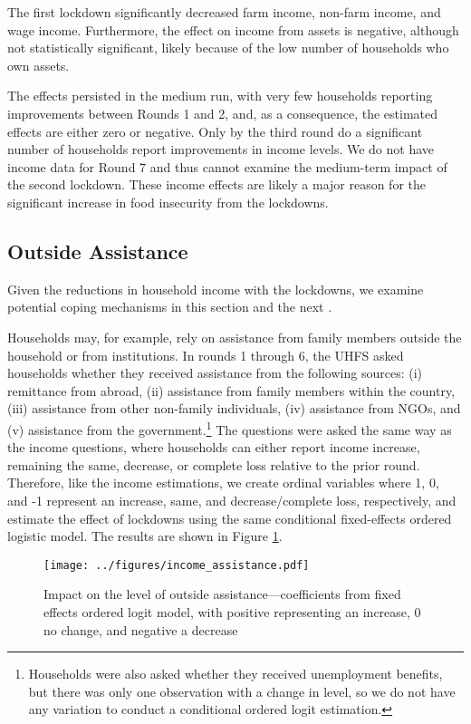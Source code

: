 \documentclass{wber}
\begin{document}
The first lockdown significantly decreased farm income, non-farm income,
and wage income. Furthermore, the effect on income from assets is
negative, although not statistically significant, likely because of the
low number of households who own assets.

The effects persisted in the medium run, with very few households
reporting improvements between Rounds 1 and 2, and, as a consequence,
the estimated effects are either zero or negative. Only by the third
round do a significant number of households report improvements in
income levels. We do not have income data for Round 7 and thus cannot
examine the medium-term impact of the second lockdown. These income
effects are likely a major reason for the significant increase in food
insecurity from the lockdowns.

\subsection{Outside Assistance}\label{outside-assistance}

Given the reductions in household income with the lockdowns, we examine
potential coping mechanisms in this section and the next
\citep{Morduch1995, Townsend1994}.

Households may, for example, rely on assistance from family members
outside the household or from institutions. In rounds 1 through 6, the
UHFS asked households whether they received assistance from the
following sources: (i) remittance from abroad, (ii) assistance from
family members within the country, (iii) assistance from other
non-family individuals, (iv) assistance from NGOs, and (v) assistance
from the government.\footnote{Households were also asked whether they
  received unemployment benefits, but there was only one observation
  with a change in level, so we do not have any variation to conduct a
  conditional ordered logit estimation.} The questions were asked the
same way as the income questions, where households can either report
income increase, remaining the same, decrease, or complete loss relative
to the prior round. Therefore, like the income estimations, we create
ordinal variables where 1, 0, and -1 represent an increase, same, and
decrease/complete loss, respectively, and estimate the effect of
lockdowns using the same conditional fixed-effects ordered logistic
model. The results are shown in Figure \ref{fig:income_assistance}.

\begin{figure}
\centering
\texttt{[image: ../figures/income\_assistance.pdf]}
\caption{Impact on the level of outside assistance---coefficients from
fixed effects ordered logit model, with positive representing an
increase, 0 no change, and negative a
decrease}\label{fig:income_assistance}
\end{figure}
\end{document}
